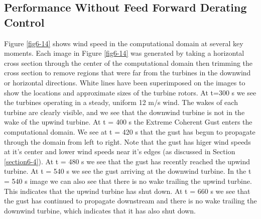 \subsection{Performance Without Feed Forward Derating Control} \label{section6-6-2}

Figure \ref{fig6-14} shows wind speed in the computational domain at several key moments. Each image in Figure \ref{fig6-14} was generated by taking a horizontal cross section through the center of the computational domain then trimming the cross section to remove regions that were far from the turbines in the downwind or horizontal directions. White lines have been superimposed on the images to show the locations and approximate sizes of the turbine rotors. At t=300 s we see the turbines operating in a steady, uniform 12 m/s wind. The wakes of each turbine are clearly visible, and we see that the downwind turbine is not in the wake of the upwind turbine. At t = 400 s the Extreme Coherent Gust enters the computational domain. We see at t = 420 s that the gust has begun to propagate through the domain from left to right. Note that the gust has higer wind speeds at it's center and lower wind speeds near it's edges (as discussed in Section \ref{section6-4}). At t = 480 s we see that the gust has recently reached the upwind turbine. At t = 540 s we see the gust arriving at the downwind turbine. In the t = 540 s image we can also see that there is no wake trailing the upwind turbine. This indicates that the upwind turbine has shut down.
 At t = 660 s we see that the gust has continued to propagate downstream and there is no wake trailing the downwind turbine, which indicates that it has also shut down.
 
